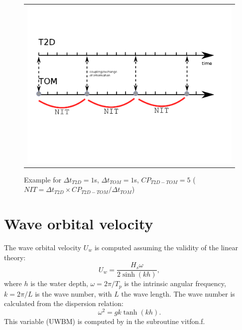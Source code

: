 \begin{figure}[H]%
  \begin{center}
    \begin{tabular}{c}
      \includegraphics[scale=0.30]{./graphics/coupling_2.png}
    \end{tabular}
    \caption{Example for $\Delta t_{T2D}=1$s, $\Delta t_{TOM}=1$s, $CP_{T2D-TOM}=5$ ($NIT=\Delta t_{T2D}\times CP_{T2D-TOM}/\Delta t_{TOM}$)}
\end{center}
\end{figure}


\section{Wave orbital velocity}
The wave orbital velocity $U_w$ is computed assuming the validity of the linear theory:
\begin{equation*}
U_w=\frac{H_s \omega }{2 \sinh (kh)},
\end{equation*}
where $h$ is the water depth, $\omega = 2\pi/T_p$ is the intrinsic angular frequency, $k = 2\pi/L$ is the wave number, with $L$ the wave length. The wave number is calculated from the dispersion relation:
\begin{equation*}
\omega^2 = gk\tanh (kh).
\end{equation*}
This variable ({\ttfamily UWBM}) is computed by \tomawac{} in the subroutine {\ttfamily vitfon.f}.


